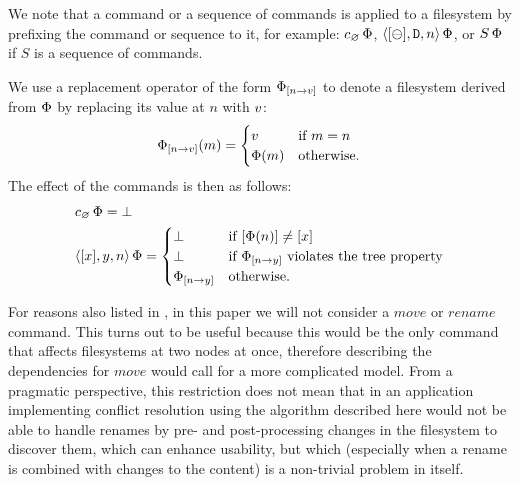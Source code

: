We note that a command or a sequence of commands is applied to a filesystem
by prefixing the command or sequence to it, for example: $c_\varnothing\,\Phi$, $\langle{[\ominus],\mathtt{D},n}\rangle\,\Phi$, 
or $S\,\Phi$ if $S$ is a sequence of commands.

\begin{mydef}
We use a replacement operator of the form
${\Phi}_{[{n}\rightarrow{v}]}$ to denote a filesystem derived from $\Phi$ 
by replacing its value at $n$ with $v$:
\[ {\Phi}_{[{n}\rightarrow{v}]}(m) =
   \begin{cases}
   v &\mbox{if~} m=n\\
   \Phi(m) &\mbox{otherwise.}
   \end{cases}
\]
The effect of the commands is then as follows:
\begin{align*}
&c_\varnothing\,\Phi = \bot \\
&\langle{[x],y,n}\rangle\,\Phi = 
   \begin{cases}
   \bot &\mbox{if~} [\Phi(n)]\neq[x]\\
   \bot &\mbox{if~} {\Phi}_{[{n}\rightarrow{y}]} \mbox{~violates the tree property}\\
   {\Phi}_{[{n}\rightarrow{y}]} &\mbox{otherwise.}
   \end{cases}
\end{align*}
\end{mydef}



\bigskip

\noindent
For reasons also listed in \cite{NREC}, in this paper we will not consider
a $move$ or $rename$ command.
This turns out to be useful because this would be the only command that affects
filesystems at two nodes at once, therefore describing 
the dependencies for $move$ would call for a more complicated model.
From a pragmatic perspective, this restriction does not mean that in an application
implementing conflict resolution using the algorithm described here would not be
able to handle renames by pre- and post-processing changes in the filesystem to
discover them, which can enhance usability, but which
(especially when a rename is combined with changes to the content)
is a non-trivial problem in itself.
